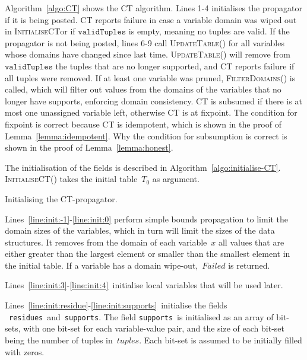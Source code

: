 \documentclass[a4paper,11pt]{article}
\newcommand{\Algoref}[1]{Algorithm~\ref{#1}}
\newcommand{\Linesref}[2]{Lines~\ref{#1}-\ref{#2}}
\newcommand{\CurrTable}{\texttt{validTuples}}
\newcommand{\Supports}{\texttt{supports}}
\newcommand{\Residues}{\texttt{residues}}
\def\UpdateTable{\textsc{UpdateTable}}
\def\FilterDomains{\textsc{FilterDomains}}
\def\InitialiseCT{\textsc{InitialiseCT}}
\newcommand{\localvar}[1]{\mathit{#1}}
\numberwithin{equation}{section}
\begin{document}
\Algoref{algo:CT} shows the CT algorithm. Lines 1-4 initialises the propagator
if it is being posted. CT reports failure in case a variable domain was
wiped out in \InitialiseCT or if $\CurrTable$ is empty, meaning no tuples are valid.
If the propagator is not being posted,
lines 6-9 call \UpdateTable() for all variables whose domains have changed
since last time. \UpdateTable() will remove from $\CurrTable$ the tuples that
are no longer supported, and CT reports failure if all tuples were removed.
If at least one variable was pruned, \FilterDomains() is
called, which will filter out values from the domains of the variables that
no longer have supports, enforcing domain consistency.
CT is subsumed if there is at most one unassigned variable
left, otherwise CT is at fixpoint.
The condition for fixpoint is correct because CT is idempotent,
which is shown in the proof of Lemma~\ref{lemma:idempotent}.
Why the condition for subsumption is correct is shown in the proof of 
Lemma~\ref{lemma:honest}.



The initialisation of the fields is described in
\Algoref{algo:initialise-CT}. \InitialiseCT() takes the 
initial table~$\localvar{T_0}$ as argument.

\begin{algorithm}[H]
  \begin{algorithmic}[1]  %
    
  \end{algorithmic}
  \caption{Initialising the CT-propagator.}
  \label{algo:initialise-CT}
\end{algorithm}

\Linesref{line:init:-1}{line:init:0} perform simple bounds
  propagation to limit the domain sizes of the variables,
  which in turn will limit the sizes of the data structures.
  It removes
  from the domain of each variable~$x$ all values that are either greater 
  than the largest element or smaller than the smallest element in the
  initial table. If a variable has a domain wipe-out,~$Failed$ is returned.

\Linesref{line:init:3}{line:init:4}~initialise local variables that will be 
used later.

\Linesref{line:init:residue}{line:init:supports}~initialise the fields
~\Residues~and~\Supports.
The field \Supports~is initialised as an array of bit-sets, with one bit-set for each
variable-value pair, and the size of each
bit-set being the number of tuples in~$\localvar{tuples}$. Each bit-set is assumed
to be initially filled with zeros.
\end{document}
